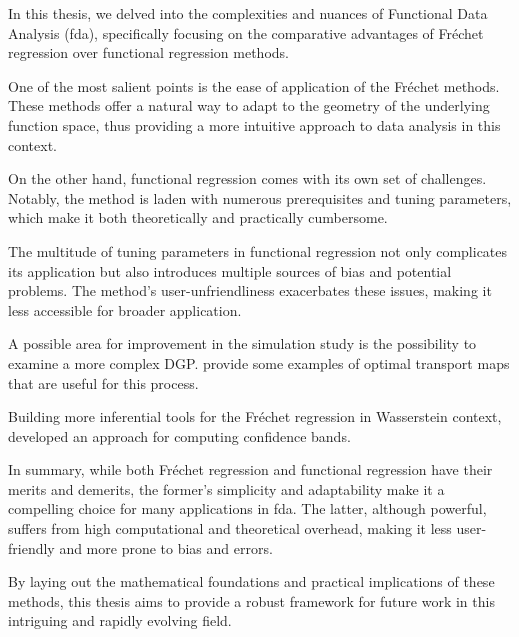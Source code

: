 In this thesis, we delved into the complexities and nuances of Functional Data
Analysis (fda), specifically focusing on the comparative advantages of Fréchet
regression over functional regression methods.

One of the most salient points is the ease of application of the Fréchet methods.
These methods offer a natural way to adapt to the geometry of the underlying function
space, thus providing a more intuitive approach to data analysis in this context.

On the other hand, functional regression comes with its own set of challenges. Notably,
the method is laden with numerous prerequisites and tuning parameters, which make it
both theoretically and practically cumbersome.

The multitude of tuning parameters in functional regression not only complicates its
application but also introduces multiple sources of bias and potential problems. The
method's user-unfriendliness exacerbates these issues, making it less accessible for
broader application.

A possible area for improvement in the simulation study is the possibility to examine
a more complex DGP. \textcite{PanaretosZemel2016} provide some
examples of optimal transport maps that are useful for this process.

Building more inferential tools for the Fréchet regression in Wasserstein context,
\textcite{PetersenLiuDivani2021} developed an approach for computing confidence bands.

In summary, while both Fréchet regression and functional regression have their merits
and demerits, the former's simplicity and adaptability make it a compelling choice for
many applications in fda. The latter, although powerful, suffers from high computational
and theoretical overhead, making it less user-friendly and more prone to bias and errors.

By laying out the mathematical foundations and practical implications of these methods,
this thesis aims to provide a robust framework for future work in this intriguing and
rapidly evolving field.
